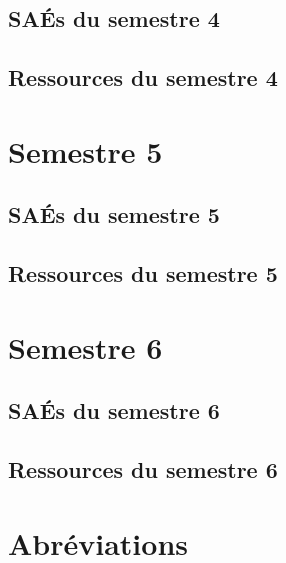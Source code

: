 \documentclass[10pt,french]{article} %
\begin{document}
\subsection{SAÉs du semestre 4}


\subsection{Ressources du semestre 4}


\newpage


\section{Semestre 5}
\def\sem{E} %

\subsection{SAÉs du semestre 5}


\subsection{Ressources du semestre 5}


\newpage


\section{Semestre 6}
\def\sem{F} %

\subsection{SAÉs du semestre 6}


\subsection{Ressources du semestre 6}


\newpage


\section{Abréviations}

\begin{multicols}{2}\small

\end{multicols}
\end{document}
